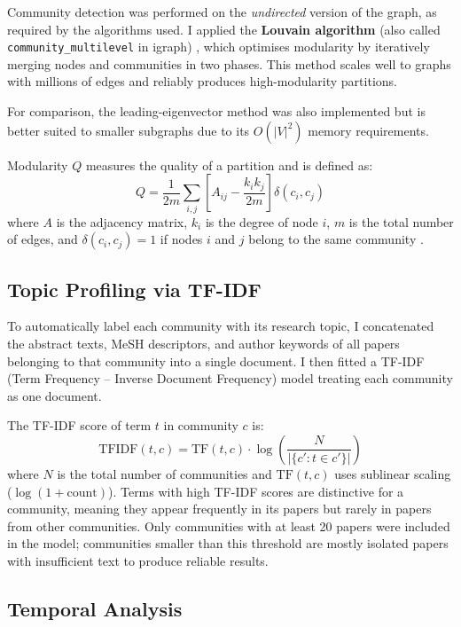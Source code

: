 \documentclass[12pt,a4paper]{article}
\begin{document}
Community detection was performed on the \textit{undirected} version of the graph,
as required by the algorithms used.
I applied the \textbf{Louvain algorithm} (also called \texttt{community\_multilevel} in
igraph) \cite{blondel2008}, which optimises modularity by iteratively merging nodes and
communities in two phases.
This method scales well to graphs with millions of edges and reliably produces
high-modularity partitions.

For comparison, the leading-eigenvector method \cite{newman2006} was also implemented
but is better suited to smaller subgraphs due to its $O(|V|^2)$ memory requirements.

Modularity $Q$ measures the quality of a partition and is defined as:
\begin{equation}
Q = \frac{1}{2m} \sum_{i,j} \left[ A_{ij} - \frac{k_i k_j}{2m} \right] \delta(c_i, c_j)
\end{equation}
where $A$ is the adjacency matrix, $k_i$ is the degree of node $i$, $m$ is the total
number of edges, and $\delta(c_i, c_j) = 1$ if nodes $i$ and $j$ belong to the same
community \cite{fortunato2010}.

\subsection{Topic Profiling via TF-IDF}

To automatically label each community with its research topic, I concatenated the
abstract texts, MeSH descriptors, and author keywords of all papers belonging to that
community into a single document.
I then fitted a TF-IDF (Term Frequency -- Inverse Document Frequency) model
\cite{salton1988} treating each community as one document.

The TF-IDF score of term $t$ in community $c$ is:
\begin{equation}
\mathrm{TFIDF}(t, c) = \mathrm{TF}(t,c) \cdot \log\left(\frac{N}{|\{c' : t \in c'\}|}\right)
\end{equation}
where $N$ is the total number of communities and $\mathrm{TF}(t,c)$ uses sublinear
scaling ($\log(1 + \mathrm{count})$).
Terms with high TF-IDF scores are distinctive for a community, meaning they appear
frequently in its papers but rarely in papers from other communities.
Only communities with at least 20 papers were included in the model;
communities smaller than this threshold are mostly isolated papers with insufficient
text to produce reliable results.

\subsection{Temporal Analysis}
\end{document}
